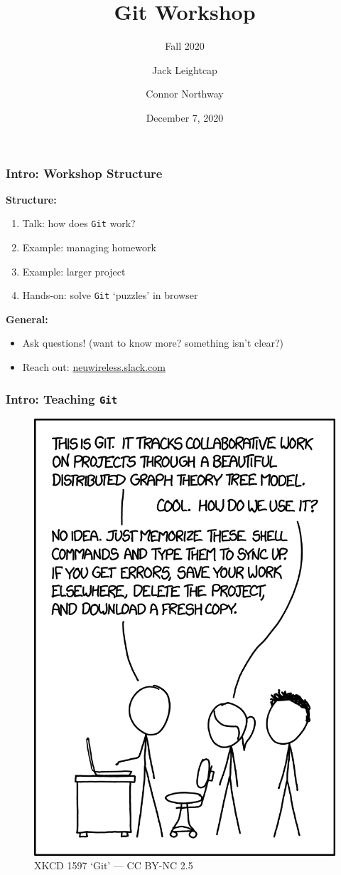 \documentclass{beamer} \usetheme{Madrid}
\title{Git Workshop}
\subtitle{Fall 2020}
\author[]{Jack Leightcap\inst{1}\inst{2} \and Connor Northway\inst{2}}
\institute[IEEE, Wireless Club]{
    \inst{1}IEEE -- \url{nuieeeofficers@gmail.com}
    \and
    \inst{2}Wireless Club -- \url{nuwirelessclub@gmail.com}
}
\date[Fall 2020]{December 7, 2020}
\begin{document}
\frame{\titlepage}

\begin{frame}
    \frametitle{Intro: Workshop Structure}
    \centering \textbf{Structure:}
    \begin{enumerate}
        \setlength\itemsep{1em}
        \item Talk: how does \texttt{Git} work?
        \item Example: managing homework
        \item Example: larger project
        \item Hands-on: solve \texttt{Git} `puzzles' in browser
    \end{enumerate}
    \vfill
    \centering \textbf{General:}
    \begin{itemize}
        \setlength\itemsep{1em}
        \item Ask questions!
              (want to know more? something isn't clear?)
        \item Reach out: \url{neuwireless.slack.com}
    \end{itemize}
\end{frame}

\begin{frame}
    \frametitle{Intro: Teaching \texttt{Git}}
    \begin{figure}
        \includegraphics[height=\textheight-25mm]{xkcd.png}
        \caption{XKCD 1597 `Git' --- CC BY-NC 2.5}
    \end{figure}
\end{frame}
\end{document}
